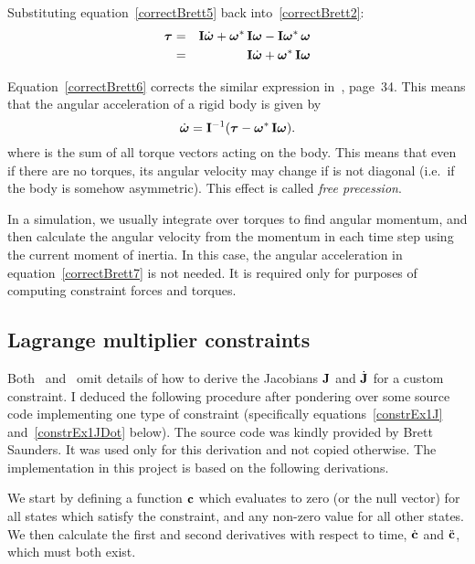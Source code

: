 Substituting equation~\ref{correctBrett5} back into~\ref{correctBrett2}:
\begin{eqnarray}
\ve{\tau} & = & \m{I}\dot{\ve{\omega}} + \dual{\ve{\omega}}\,\m{I}\ve{\omega} -
    \m{I}\dual{\ve{\omega}}\,\ve{\omega} \nonumber \\
& = & \m{I}\dot{\ve{\omega}} + \dual{\ve{\omega}}\,\m{I}\ve{\omega} \label{correctBrett6}
\end{eqnarray}

Equation~\ref{correctBrett6} corrects the similar expression in~\cite{Saunders:PhD},
page~34. This means that the angular acceleration of a rigid body is given by
\begin{equation}
\label{correctBrett7}
\dot{\ve{\omega}} = \m{I}^{-1} (\ve{\tau} - \dual{\ve{\omega}}\,\m{I}\ve{\omega}).
\end{equation}
where \ve{\tau} is the sum of all torque vectors acting on the body. This means that even if
there are no torques, its angular velocity may change if  is not diagonal (i.e.\ if
the body is somehow asymmetric). This effect is called \emph{free precession}.

In a simulation, we usually integrate over torques to find angular momentum, and then calculate
the angular velocity from the momentum in each time step using the current moment of inertia. In
this case, the angular acceleration in equation~\ref{correctBrett7} is not needed. It is required
only for purposes of computing constraint forces and torques.


\subsection{Lagrange multiplier constraints}

Both~\cite{BaraffWitkin:97} and~\cite{Saunders:PhD} omit details of how to derive the Jacobians
$\m{J}$ and $\dot{\m{J}}$ for a custom constraint. I deduced the following procedure
after pondering over some source code implementing one type of constraint
(specifically equations~\ref{constrEx1J} and~\ref{constrEx1JDot} below). The source code
was kindly provided by Brett Saunders. It was used only for this derivation and not copied
otherwise. The implementation in this project is based on the following derivations.

We start by defining a function $\ve{c}$ which evaluates to zero (or the null vector) for
all states which satisfy the constraint, and any non-zero value for all other states. 
We then calculate the first and second derivatives with respect to time, $\dot{\ve{c}}$
and $\ddot{\ve{c}}$, which must both exist.

